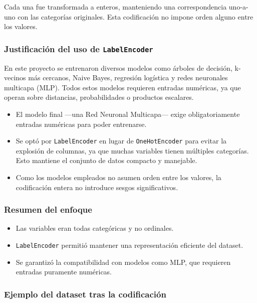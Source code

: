 \documentclass[11pt,a4paper]{article}
\begin{document}
Cada una fue transformada a enteros, manteniendo una correspondencia uno-a-uno con las categorías originales. Esta codificación no impone orden alguno entre los valores.

\medskip

\subsubsection*{Justificación del uso de \texttt{LabelEncoder}}

En este proyecto se entrenaron diversos modelos como árboles de decisión, k-vecinos más cercanos, Naive Bayes, regresión logística y redes neuronales multicapa (MLP). Todos estos modelos requieren entradas numéricas, ya que operan sobre distancias, probabilidades o productos escalares.

\begin{itemize}
    \item El modelo final —una Red Neuronal Multicapa— exige obligatoriamente entradas numéricas para poder entrenarse.
    \item Se optó por \texttt{LabelEncoder} en lugar de \texttt{OneHotEncoder} para evitar la explosión de columnas, ya que muchas variables tienen múltiples categorías. Esto mantiene el conjunto de datos compacto y manejable.
    \item Como los modelos empleados no asumen orden entre los valores, la codificación entera no introduce sesgos significativos.
\end{itemize}

\medskip

\subsubsection*{Resumen del enfoque}

\begin{itemize}
    \item Las variables eran todas categóricas y no ordinales.
    \item \texttt{LabelEncoder} permitió mantener una representación eficiente del dataset.
    \item Se garantizó la compatibilidad con modelos como MLP, que requieren entradas puramente numéricas.
\end{itemize}

\medskip

\subsubsection*{Ejemplo del dataset tras la codificación}
\end{document}
